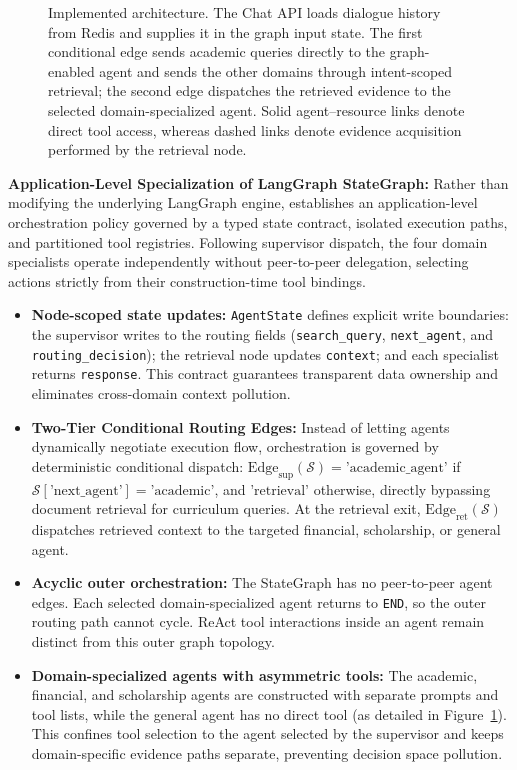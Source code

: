 \begin{figure}[h!]
\begin{tikzpicture}
\end{tikzpicture}
\caption{Implemented \system{} architecture. The Chat API loads dialogue history from Redis and supplies it in the graph input state. The first conditional edge sends academic queries directly to the graph-enabled agent and sends the other domains through intent-scoped retrieval; the second edge dispatches the retrieved evidence to the selected domain-specialized agent. Solid agent--resource links denote direct tool access, whereas dashed links denote evidence acquisition performed by the retrieval node.}
\label{fig:architecture}
\end{figure}

\textbf{Application-Level Specialization of LangGraph StateGraph:}
Rather than modifying the underlying LangGraph engine, \system{} establishes an application-level orchestration policy governed by a typed state contract, isolated execution paths, and partitioned tool registries. Following supervisor dispatch, the four domain specialists operate independently without peer-to-peer delegation, selecting actions strictly from their construction-time tool bindings.
\begin{itemize}
    \item \textbf{Node-scoped state updates:} \texttt{AgentState} defines explicit write boundaries: the supervisor writes to the routing fields (\texttt{search\_query}, \texttt{next\_agent}, and \texttt{routing\_decision}); the retrieval node updates \texttt{context}; and each specialist returns \texttt{response}. This contract guarantees transparent data ownership and eliminates cross-domain context pollution.
    
    \item \textbf{Two-Tier Conditional Routing Edges:} Instead of letting agents dynamically negotiate execution flow, orchestration is governed by deterministic conditional dispatch: $\mathrm{Edge}_{\text{sup}}(\mathcal{S}) = \text{'academic\_agent'}$ if $\mathcal{S}[\text{'next\_agent'}] = \text{'academic'}$, and $\text{'retrieval'}$ otherwise, directly bypassing document retrieval for curriculum queries. At the retrieval exit, $\mathrm{Edge}_{\text{ret}}(\mathcal{S})$ dispatches retrieved context to the targeted financial, scholarship, or general agent.
    
    \item \textbf{Acyclic outer orchestration:} The StateGraph has no peer-to-peer agent edges. Each selected domain-specialized agent returns to \texttt{END}, so the outer routing path cannot cycle. ReAct tool interactions inside an agent remain distinct from this outer graph topology.
    
    \item \textbf{Domain-specialized agents with asymmetric tools:} The academic, financial, and scholarship agents are constructed with separate prompts and tool lists, while the general agent has no direct tool (as detailed in Figure~\ref{fig:architecture}). This confines tool selection to the agent selected by the supervisor and keeps domain-specific evidence paths separate, preventing decision space pollution.
\end{itemize}

